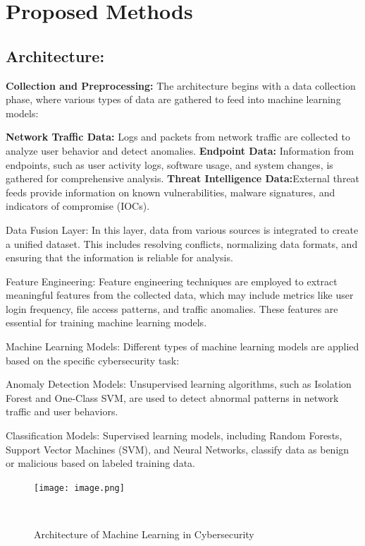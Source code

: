 \documentclass[oneside,a4paper,12pt]{report}
\begin{document}
 
\newpage
\chapter{Proposed Methods}
\section{Architecture:}
\textbf {Collection and Preprocessing:}
The architecture begins with a data collection phase, where various types of data are gathered to feed into machine learning models:


\newline
\textbf {Network Traffic Data:} Logs and packets from network traffic are collected to analyze user behavior and detect anomalies.
\newline
\textbf {Endpoint Data:} Information from endpoints, such as user activity logs, software usage, and system changes, is gathered for comprehensive analysis.
\newline 
\textbf {Threat Intelligence Data:}External threat feeds provide information on known vulnerabilities, malware signatures, and indicators of compromise (IOCs).

\pageborder

Data Fusion Layer: 
In this layer, data from various sources is integrated to create a unified dataset. This includes resolving conflicts, normalizing data formats, and ensuring that the information is reliable for analysis.

Feature Engineering:  
Feature engineering techniques are employed to extract meaningful features from the collected data, which may include metrics like user login frequency, file access patterns, and traffic anomalies. These features are essential for training machine learning models.

\pageborder

Machine Learning Models: 
Different types of machine learning models are applied based on the specific cybersecurity task:

 Anomaly Detection Models: Unsupervised learning algorithms, such as Isolation Forest and One-Class SVM, are used to detect abnormal patterns in network traffic and user behaviors.
  
 Classification Models: Supervised learning models, including Random Forests, Support Vector Machines (SVM), and Neural Networks, classify data as benign or malicious based on labeled training data.

\begin{center}
\begin{figure}[H]
\centering
\texttt{[image: image.png]} \caption{Architecture of Machine Learning in Cybersecurity}\\
\end{figure}
\end{center}
\end{document}
